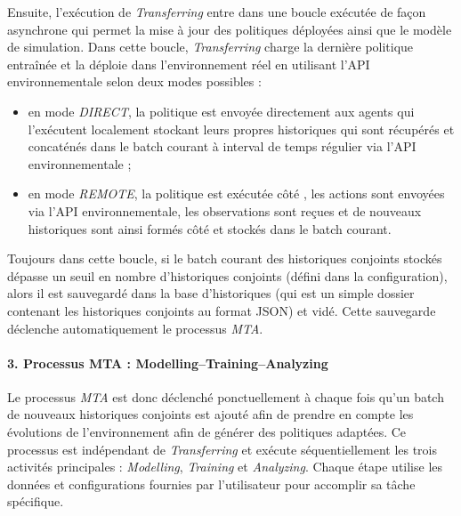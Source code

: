 Ensuite, l'exécution de \textit{Transferring} entre dans une boucle exécutée de façon asynchrone qui permet la mise à jour des politiques déployées ainsi que le modèle de simulation. Dans cette boucle, \textit{Transferring} charge la dernière politique entraînée et la déploie dans l'environnement réel en utilisant l'API environnementale selon deux modes possibles :
\begin{itemize}
  \item en mode \textit{DIRECT}, la politique est envoyée directement aux agents qui l'exécutent localement stockant leurs propres historiques qui sont récupérés et concaténés dans le batch courant à interval de temps régulier via l'API environnementale ;
  \item en mode \textit{REMOTE}, la politique est exécutée côté , les actions sont envoyées via l'API environnementale, les observations sont reçues et de nouveaux historiques sont ainsi formés côté  et stockés dans le batch courant.
\end{itemize}

Toujours dans cette boucle, si le batch courant des historiques conjoints stockés dépasse un seuil en nombre d'historiques conjoints (défini dans la configuration), alors il est sauvegardé dans la base d'historiques (qui est un simple dossier contenant les historiques conjoints au format JSON) et vidé. Cette sauvegarde déclenche automatiquement le processus \textit{MTA}.

\paragraph{3. Processus MTA : Modelling–Training–Analyzing}

Le processus \textit{MTA} est donc déclenché ponctuellement à chaque fois qu'un batch de nouveaux historiques conjoints est ajouté afin de prendre en compte les évolutions de l'environnement afin de générer des politiques adaptées. Ce processus est indépendant de \textit{Transferring} et exécute séquentiellement les trois activités principales : \textit{Modelling}, \textit{Training} et \textit{Analyzing}. Chaque étape utilise les données et configurations fournies par l'utilisateur pour accomplir sa tâche spécifique.

